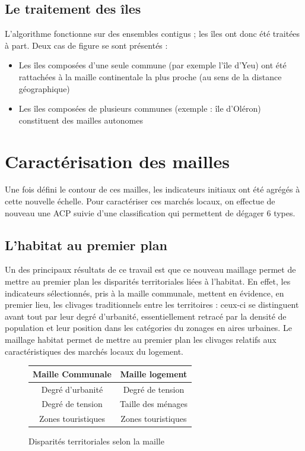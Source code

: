\documentclass[12pt, a4paper]{article}
\begin{document}
\subsection{Le traitement des îles}

L'algorithme fonctionne sur des ensembles contigus ; les îles ont donc été traitées à part. Deux cas de figure se sont présentés :
\begin{itemize}
\item Les îles composées d'une seule commune (par exemple l'île d'Yeu) ont été rattachées à la maille continentale la plus proche (au sens de la distance géographique)
\item Les îles composées de plusieurs communes (exemple : île d'Oléron) constituent des mailles autonomes
\end{itemize}


\section{Caractérisation des mailles}

Une fois défini le contour de ces mailles, les indicateurs initiaux ont été agrégés à cette nouvelle échelle. Pour caractériser ces marchés locaux, on effectue de nouveau une ACP suivie d'une classification qui permettent de dégager 6 types.

\subsection{L'habitat au premier plan}

Un des principaux résultats de ce travail est que ce nouveau maillage permet de mettre au premier plan les disparités territoriales liées à l'habitat. En effet, les indicateurs sélectionnés, pris à la maille communale, mettent en évidence, en premier lieu, les clivages traditionnels entre les territoires : ceux-ci se distinguent avant tout par leur degré d'urbanité, essentiellement retracé par la densité de population et leur position dans les catégories du zonages en aires urbaines. Le maillage habitat permet de mettre au premier plan les clivages relatifs aux caractéristiques des marchés locaux du logement.

\begin{figure}[H]
\caption{Disparités territoriales selon la maille}
\begin{center}
\begin{tabular}{c c}
Maille Communale & Maille logement \\
\hline
Degré d'urbanité & Degré de tension \\
Degré de tension & Taille des ménages \\
Zones touristiques & Zones touristiques \\
\hline
\end{tabular}
\end{center}
\end{figure}
\end{document}
